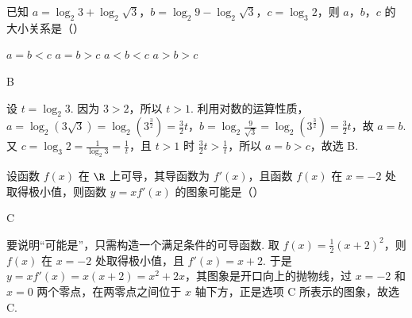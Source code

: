 \begin{problem}
已知 \(a=\log_{2}3+\log_{2}\sqrt{3}\)，\(b=\log_{2}9-\log_{2}\sqrt{3}\)，\(c=\log_{3}2\)，则 \(a\)，\(b\)，\(c\) 的大小关系是（\quad）

\choices
    {\(a=b<c\)}
    {\(a=b>c\)}
    {\(a<b<c\)}
    {\(a>b>c\)}

\begin{answer}
B
\end{answer}

\begin{solution}
设 \(t=\log_2 3\). 因为 \(3>2\)，所以 \(t>1\). 利用对数的运算性质，\(a=\log_2(3\sqrt3)=\log_2(3^{\frac{3}{2}})=\frac32t\)，\(b=\log_2\frac{9}{\sqrt3}=\log_2(3^{\frac{3}{2}})=\frac32t\)，故 \(a=b\). 又 \(c=\log_3 2=\frac{1}{\log_2 3}=\frac1t\)，且 \(t>1\) 时 \(\frac32t>\frac1t\)，所以 \(a=b>c\)，故选 B.
\end{solution}
\end{problem}

\begin{problem}
设函数 \(f(x)\) 在 \(\R\) 上可导，其导函数为 \(f'(x)\)，且函数 \(f(x)\) 在 \(x=-2\) 处取得极小值，则函数 \(y=xf'(x)\) 的图象可能是（\quad）

    {}
    {}
    {}

\begin{answer}
C
\end{answer}

\begin{solution}
要说明“可能是”，只需构造一个满足条件的可导函数. 取 \(f(x)=\frac12(x+2)^2\)，则 \(f(x)\) 在 \(x=-2\) 处取得极小值，且 \(f'(x)=x+2\). 于是 \(y=xf'(x)=x(x+2)=x^2+2x\)，其图象是开口向上的抛物线，过 \(x=-2\) 和 \(x=0\) 两个零点，在两零点之间位于 \(x\) 轴下方，正是选项 C 所表示的图象，故选 C.
\end{solution}
\end{problem}

